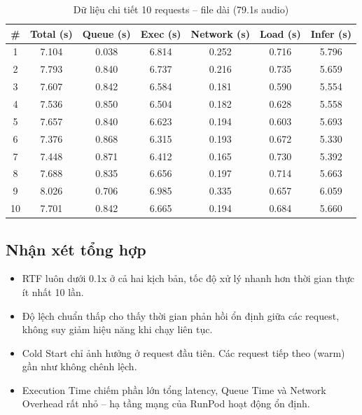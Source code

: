 \documentclass[12pt,a4paper]{article}
\begin{document}
\begin{table}[H]
\centering
\small
\begin{tabular}{ccccccc}
\toprule
\textbf{\#} & \textbf{Total (s)} & \textbf{Queue (s)} & \textbf{Exec (s)} & \textbf{Network (s)} & \textbf{Load (s)} & \textbf{Infer (s)} \\
\midrule
1  & 7.104 & 0.038 & 6.814 & 0.252 & 0.716 & 5.796 \\
2  & 7.793 & 0.840 & 6.737 & 0.216 & 0.735 & 5.659 \\
3  & 7.607 & 0.842 & 6.584 & 0.181 & 0.590 & 5.554 \\
4  & 7.536 & 0.850 & 6.504 & 0.182 & 0.628 & 5.558 \\
5  & 7.657 & 0.840 & 6.623 & 0.194 & 0.603 & 5.693 \\
6  & 7.376 & 0.868 & 6.315 & 0.193 & 0.672 & 5.330 \\
7  & 7.448 & 0.871 & 6.412 & 0.165 & 0.730 & 5.392 \\
8  & 7.688 & 0.835 & 6.656 & 0.197 & 0.714 & 5.663 \\
9  & 8.026 & 0.706 & 6.985 & 0.335 & 0.657 & 6.059 \\
10 & 7.701 & 0.842 & 6.665 & 0.194 & 0.684 & 5.660 \\
\bottomrule
\end{tabular}
\caption{Dữ liệu chi tiết 10 requests -- file dài (79.1s audio)}
\end{table}



\subsection{Nhận xét tổng hợp}

\begin{itemize}[noitemsep]
    \item RTF luôn dưới 0.1x ở cả hai kịch bản, tốc độ xử lý nhanh hơn thời gian thực ít nhất 10 lần.
    \item Độ lệch chuẩn thấp cho thấy thời gian phản hồi ổn định giữa các request, không suy giảm hiệu năng khi chạy liên tục.
    \item Cold Start chỉ ảnh hưởng ở request đầu tiên. Các request tiếp theo (warm) gần như không chênh lệch.
    \item Execution Time chiếm phần lớn tổng latency, Queue Time và Network Overhead rất nhỏ -- hạ tầng mạng của RunPod hoạt động ổn định.
\end{itemize}
\end{document}

